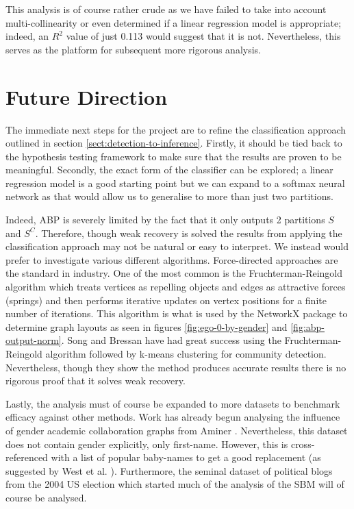 \documentclass[]{article}
\begin{document}
This analysis is of course rather crude as we have failed to take into account multi-collinearity or even determined if a linear regression model is appropriate; indeed, an $R^2$ value of just 0.113 would suggest that it is not. Nevertheless, this serves as the platform for subsequent more rigorous analysis.

\section{Future Direction}

The immediate next steps for the project are to refine the classification approach outlined in section \ref{sect:detection-to-inference}. Firstly, it should be tied back to the hypothesis testing framework to make sure that the results are proven to be meaningful. Secondly, the exact form of the classifier can be explored; a linear regression model is a good starting point but we can expand to a softmax neural network as that would allow us to generalise to more than just two partitions.

Indeed, ABP is severely limited by the fact that it only outputs 2 partitions $S$ and $S^C$. Therefore, though weak recovery is solved the results from applying the classification approach may not be natural or easy to interpret. We instead would prefer to investigate various different algorithms. Force-directed approaches are the standard in industry. One of the most common is the Fruchterman-Reingold algorithm which treats vertices as repelling objects and edges as attractive forces (springs) and then performs iterative updates on vertex positions for a finite number of iterations. This algorithm is what is used by the NetworkX package \cite{networkx} to determine graph layouts as seen in figures \ref{fig:ego-0-by-gender} and \ref{fig:abp-output-norm}. Song and Bressan \cite{force-directed} have had great success using the Fruchterman-Reingold algorithm followed by k-means clustering for community detection. Nevertheless, though they show the method produces accurate results there is no rigorous proof that it solves weak recovery.

Lastly, the analysis must of course be expanded to more datasets to benchmark efficacy against other methods. Work has already begun analysing the influence of gender academic collaboration graphs from Aminer \cite{aminer}. Nevertheless, this dataset does not contain gender explicitly, only first-name. However, this is cross-referenced with a list of popular baby-names to get a good replacement (as suggested by West et al. \cite{gender-scholarship}). Furthermore, the seminal dataset of political blogs from the 2004 US election \cite{polblogs} which started much of the analysis of the SBM will of course be analysed.
\end{document}

